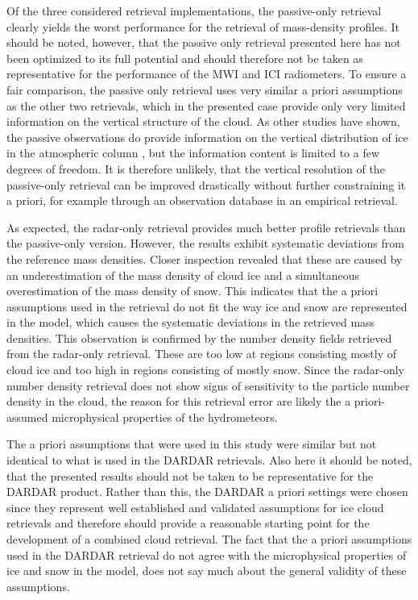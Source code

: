 \documentclass[journal abbreviation, manuscript]{copernicus}
\begin{document}
Of the three considered retrieval implementations, the passive-only retrieval
clearly yields the worst performance for the retrieval of mass-density profiles.
It should be noted, however, that the passive only retrieval presented here has
not been optimized to its full potential and should therefore not be taken as
representative for the performance of the MWI and ICI radiometers. To ensure a
fair comparison, the passive only retrieval uses very similar a priori
assumptions as the other two retrievals, which in the presented case provide
only very limited information on the vertical structure of the cloud. As other
studies have shown, the passive observations do provide information on the
vertical distribution of ice in the atmospheric column \citep{wang17,
  grutzun18}, but the information content is limited to a few degrees of
freedom. It is therefore unlikely, that the vertical resolution of the
passive-only retrieval can be improved drastically without further constraining
it a priori, for example through an observation database in an empirical
retrieval.

As expected, the radar-only retrieval provides much better profile retrievals
than the passive-only version. However, the results exhibit systematic
deviations from the reference mass densities. Closer inspection revealed that
these are caused by an underestimation of the mass density of cloud ice and a
simultaneous overestimation of the mass density of snow. This indicates that the
a priori assumptions used in the retrieval do not fit the way ice and snow are
represented in the model, which causes the systematic deviations in the
retrieved mass densities. This observation is confirmed by the number density
fields retrieved from the radar-only retrieval. These are too low at regions
consisting mostly of cloud ice and too high in regions consisting of mostly
snow. Since the radar-only number density retrieval does not show signs of
sensitivity to the particle number density in the cloud, the reason for this
retrieval error are likely the a priori-assumed microphysical properties of the
hydrometeors.

The a priori assumptions that were used in this study were similar but not
identical to what is used in the DARDAR retrievals. Also here it should be
noted, that the presented results should not be taken to be representative for
the DARDAR product. Rather than this, the DARDAR a priori settings were chosen
since they represent well established and validated assumptions for ice cloud
retrievals and therefore should provide a reasonable starting point for the
development of a combined cloud retrieval. The fact that the a priori
assumptions used in the DARDAR retrieval do not agree with the microphysical
properties of ice and snow in the model, does not say much about the general
validity of these assumptions.
\end{document}
